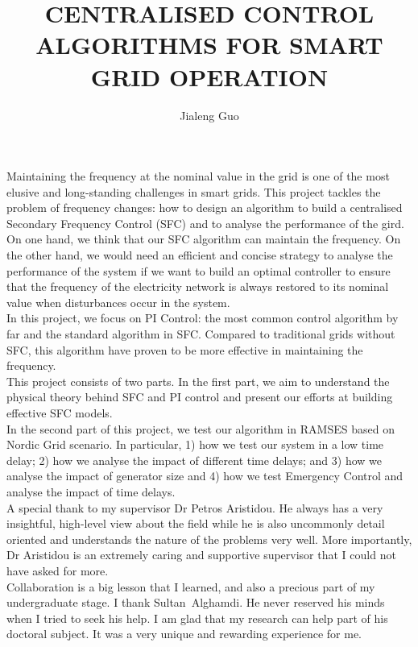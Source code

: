 \documentclass{report}
\begin{document}
\title{CENTRALISED CONTROL ALGORITHMS FOR SMART GRID OPERATION}
\author{Jialeng Guo}

\beforepreface
{}
Maintaining the frequency at the nominal value in the grid is one of the most elusive and long-standing challenges in smart grids. This project tackles the problem of  frequency changes: how to design an algorithm to build a centralised Secondary Frequency Control (SFC) and to analyse the performance of the gird. On one hand, we think that our SFC algorithm can maintain the frequency. On the other hand, we would need an efficient and concise strategy to analyse the performance of the system if we want to build an optimal controller to ensure that the frequency of the electricity network is always restored to its nominal value when disturbances occur in the system.\\

In this project, we focus on PI Control: the most common control algorithm by far and the standard algorithm in SFC. Compared to traditional grids without SFC, this algorithm have proven to be more effective in maintaining the frequency.\\

This project consists of two parts. In the first part, we aim to understand the physical theory behind SFC and PI control and present our efforts at building effective SFC models.\\

In the second part of this project, we test our algorithm in RAMSES based on Nordic Grid scenario. In particular, 1) how we test our system in a low time delay; 2) how we analyse the impact of different time delays; and 3) how we analyse the impact of generator size and 4) how we test Emergency Control and analyse the impact of time delays.\\

A special thank to my supervisor Dr Petros Aristidou. He always has a very insightful, high-level view about the ﬁeld while he is also uncommonly detail oriented and understands the nature of the problems very well. More importantly, Dr Aristidou is an extremely caring and supportive supervisor that I could not have asked for more.\\

Collaboration is a big lesson that I learned, and also a precious part of my undergraduate stage. I thank Sultan Alghamdi. He never reserved his minds when I tried to seek his help. I am glad that my research can help part of his doctoral subject. It was a very unique and rewarding experience for me.\\
\end{document}
